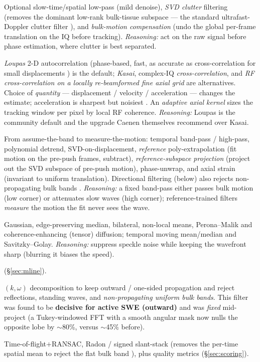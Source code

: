 \documentclass[11pt,a4paper]{article}
\newcommand{\good}[1]{\textcolor{green!45!black}{\textbf{#1}}}
\begin{document}
\begin{description}[leftmargin=1.2em]
  \item[1. IQ/RF pre-filter.] Optional slow-time/spatial low-pass (mild denoise), \emph{SVD clutter}
  filtering (removes the dominant low-rank bulk-tissue subspace --- the standard ultrafast-Doppler clutter
  filter \cite{demene2015}), and \emph{bulk-motion compensation} (undo the global per-frame translation on
  the IQ before tracking). \emph{Reasoning:} act on the raw signal before phase estimation, where clutter is
  best separated.
  \item[2. Displacement estimation.] \emph{Loupas} 2-D autocorrelation (phase-based, fast, as accurate as
  cross-correlation for small displacements \cite{pinton2006}) is the default; \emph{Kasai}, complex-IQ
  \emph{cross-correlation}, and \emph{RF cross-correlation on a locally re-beamformed fine axial grid} are
  alternatives. Choice of \emph{quantity} --- displacement / velocity / acceleration --- changes the
  estimate; acceleration is sharpest but noisiest \cite{petrescu2022}. An \emph{adaptive axial kernel} sizes
  the tracking window per pixel by local RF coherence. \emph{Reasoning:} Loupas is the community default and
  the upgrade Caenen themselves recommend over Kasai.
  \item[3. Cardiac-motion removal (the crux in vivo).] From assume-the-band to measure-the-motion: temporal
  band-pass / high-pass, polynomial detrend, SVD-on-displacement, \emph{reference} poly-extrapolation
  (fit motion on the pre-push frames, subtract), \emph{reference-subspace projection} (project out the SVD
  subspace of pre-push motion), phase-unwrap, and axial strain (invariant to uniform translation). Directional
  filtering (below) also rejects non-propagating bulk bands \cite{manduca2003}. \emph{Reasoning:} a fixed
  band-pass either passes bulk motion (low corner) or attenuates slow waves (high corner); reference-trained
  filters \emph{measure} the motion the fit never sees the wave.
  \item[4--5. Spatial \& temporal smoothing.] Gaussian, edge-preserving median, bilateral, non-local means,
  Perona--Malik and coherence-enhancing (tensor) diffusion; temporal moving mean/median and Savitzky--Golay.
  \emph{Reasoning:} suppress speckle noise while keeping the wavefront sharp (blurring it biases the speed).
  \item[6. M-line offset averaging] (\S\ref{sec:mline}).
  \item[7. Directional filter.] $(k,\omega)$ decomposition to keep outward / one-sided propagation and reject
  reflections, standing waves, and \emph{non-propagating uniform bulk bands}. This filter was found to be
  \good{decisive for active SWE (outward)} and was \emph{fixed} mid-project (a Tukey-windowed FFT with a
  smooth angular mask now nulls the opposite lobe by $\sim$80\%, versus $\sim$45\% before).
  \item[8. Speed + quality.] Time-of-flight$+$RANSAC, Radon / signed slant-stack (removes the per-time
  spatial mean to reject the flat bulk band \cite{mclaughlin2010}), plus quality metrics (\S\ref{sec:scoring}).
\end{description}
\end{document}
